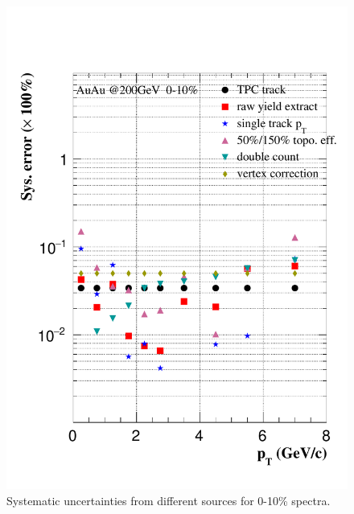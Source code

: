 \begin{figure}[htbp]
\begin{minipage}[htbp]{0.47\linewidth}
\centering
\includegraphics[width=1.0\textwidth,angle=0]{figure/Run14_D0HFT/sysErr_0_10_2.pdf}
\caption{ Systematic uncertainties from different sources for 0-10\% spectra. \label{sysErr_0_10}}
\end{minipage}
\hfill
\begin{minipage}[htbp]{0.47\linewidth}
\centering

\end{minipage}
\end{figure}
